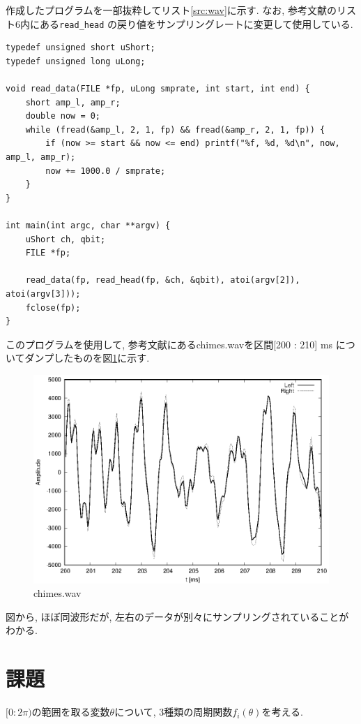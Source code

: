\documentclass[titlepage]{jsarticle}
\begin{document}
        作成したプログラムを一部抜粋してリスト\ref{src:wav}に示す. なお, 参考文献\cite{Text}のリスト6内にある\verb|read_head|
        の戻り値をサンプリングレートに変更して使用している.

        \begin{lstlisting}[caption=wav2txt-s16.c, label=src:wav]
typedef unsigned short uShort;
typedef unsigned long uLong;

void read_data(FILE *fp, uLong smprate, int start, int end) {
    short amp_l, amp_r;
    double now = 0;
    while (fread(&amp_l, 2, 1, fp) && fread(&amp_r, 2, 1, fp)) {
        if (now >= start && now <= end) printf("%f, %d, %d\n", now, amp_l, amp_r);
        now += 1000.0 / smprate;
    }
}

int main(int argc, char **argv) {
    uShort ch, qbit;
    FILE *fp;
    
    read_data(fp, read_head(fp, &ch, &qbit), atoi(argv[2]), atoi(argv[3]));
    fclose(fp);
}\end{lstlisting}
        
        このプログラムを使用して, 参考文献\cite{Support Page}にあるchimes.wavを区間[200 : 210] ms
        についてダンプしたものを図\ref{fig:wav}に示す.

        \begin{figure}[h]
            \centering
            \includegraphics[width=0.8\hsize]{images/chimes.eps}
            \caption{chimes.wav}
            \label{fig:wav}
        \end{figure}

        図から, ほぼ同波形だが, 左右のデータが別々にサンプリングされていることがわかる.

\section{課題}
    $[0:2\pi)$の範囲を取る変数$\theta$について, 3種類の周期関数$f_i(\theta)$を考える.
\end{document}
